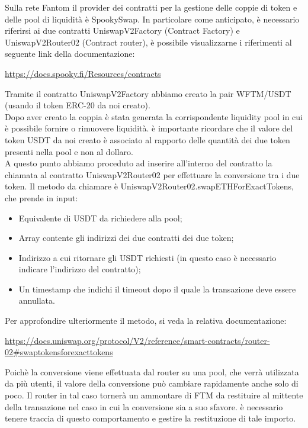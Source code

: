 Sulla rete Fantom il provider dei contratti per la gestione delle coppie di token e delle pool di liquidità è SpookySwap. In particolare come anticipato, è necessario riferirsi ai due contratti UniswapV2Factory (Contract Factory) e UniswapV2Router02 (Contract router), è possibile visualizzarne i riferimenti al seguente link della documentazione:

\begin{center}
    \href{https://docs.spooky.fi/Resources/contracts}{https://docs.spooky.fi/Resources/contracts}
\end{center}


Tramite il contratto UniswapV2Factory abbiamo creato la pair WFTM/USDT (usando il token ERC-20 da noi creato).\\ Dopo aver creato la coppia è stata generata la corrispondente liquidity pool in cui è possibile fornire o rimuovere liquidità. 
è importante ricordare che il valore del token USDT da noi creato è associato al rapporto delle quantità dei due token presenti nella pool e non al dollaro.\\

A questo punto abbiamo proceduto ad inserire all'interno del contratto la chiamata al contratto UniswapV2Router02 per effettuare la conversione tra i due token.
Il metodo da chiamare è UniswapV2Router02.swapETHForExactTokens, che prende in input:

\begin{itemize}
    \item Equivalente di USDT da richiedere alla pool;
    \item Array contente gli indirizzi dei due contratti dei due token;
    \item Indirizzo a cui ritornare gli USDT richiesti (in questo caso è necessario indicare l'indirizzo del contratto);
    \item Un timestamp che indichi il timeout dopo il quale la transazione deve essere annullata.
\end{itemize}

Per approfondire ulteriormente il metodo, si veda la relativa documentazione:

\begin{center}
    \href{https://docs.uniswap.org/protocol/V2/reference/smart-contracts/router-02\#swaptokensforexacttokens}{https://docs.uniswap.org/protocol/V2/reference/smart-contracts/router-02\#swaptokensforexacttokens}
\end{center}

Poichè la conversione viene effettuata dal router su una pool, che verrà utilizzata da più utenti, il valore della conversione può cambiare rapidamente anche solo di poco. Il router in tal caso tornerà un ammontare di FTM da restituire al mittente della transazione nel caso in cui la conversione sia a suo sfavore. è necessario tenere traccia di questo comportamento e gestire la restituzione di tale importo.

